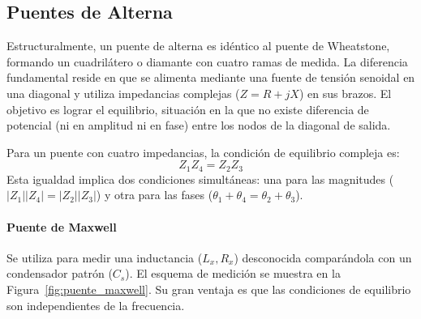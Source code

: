 \subsection{Puentes de Alterna}

Estructuralmente, un puente de alterna es idéntico al puente de Wheatstone, formando un cuadrilátero o diamante con cuatro ramas de medida. La diferencia fundamental reside en que se alimenta mediante una fuente de tensión senoidal en una diagonal y utiliza impedancias complejas ($Z = R + jX$) en sus brazos. El objetivo es lograr el equilibrio, situación en la que no existe diferencia de potencial (ni en amplitud ni en fase) entre los nodos de la diagonal de salida.

Para un puente con cuatro impedancias, la condición de equilibrio compleja es:
\begin{equation}
    Z_1 Z_4 = Z_2 Z_3
\end{equation}
Esta igualdad implica dos condiciones simultáneas: una para las magnitudes ($|Z_1||Z_4| = |Z_2||Z_3|$) y otra para las fases ($\theta_1 + \theta_4 = \theta_2 + \theta_3$).

\paragraph{Puente de Maxwell} Se utiliza para medir una inductancia ($L_x, R_x$) desconocida comparándola con un condensador patrón ($C_s$). El esquema de medición se muestra en la Figura~\ref{fig:puente_maxwell}. Su gran ventaja es que las condiciones de equilibrio son independientes de la frecuencia.

\begin{marginfigure}
    \centering
    \shorthandoff{>}
    \caption[Puente de Maxwell.]{Puente de Maxwell para la medida de inductancias. Al equilibrar el puente, se obtienen los valores de $L_x$ y $R_x$ a partir de componentes puramente resistivos y un condensador patrón $C_s$.}\label{fig:puente_maxwell}
\end{marginfigure}

